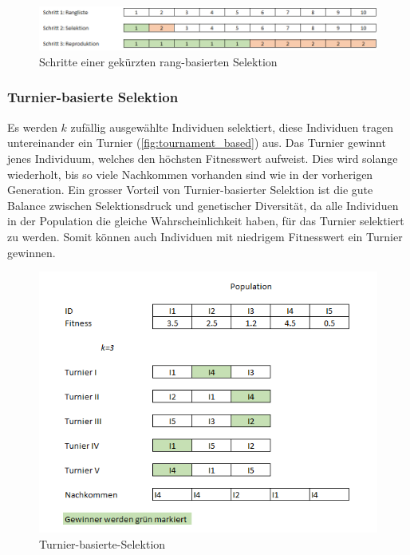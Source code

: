         \begin{figure}[H]
          \includegraphics[width=\textwidth,center]{graphics/truncated_rank_based_selection}
          \caption{Schritte einer gekürzten rang-basierten Selektion\label{fig:truncated_rank_based_selection}}
        \end{figure}

      \subsubsection{Turnier-basierte Selektion\label{subsub:Turnier}}

        Es werden \(k\) zufällig ausgewählte Individuen selektiert,
        diese Individuen tragen untereinander ein Turnier (\vref{fig:tournament_based}) aus.
        Das Turnier gewinnt jenes Individuum, welches den höchsten Fitnesswert aufweist.
        Dies wird solange wiederholt, bis so viele Nachkommen vorhanden sind wie in der vorherigen Generation.
        Ein grosser Vorteil von Turnier-basierter Selektion ist die gute Balance zwischen
        Selektionsdruck und genetischer Diversität,
        da alle Individuen in der Population die gleiche Wahrscheinlichkeit haben, für das Turnier selektiert zu werden.
        Somit können auch Individuen mit niedrigem Fitnesswert ein Turnier gewinnen.

        \begin{figure}[H]
          \includegraphics[scale=1,center]{graphics/tournament_based}
          \caption{Turnier-basierte-Selektion\label{fig:tournament_based}}
        \end{figure}

